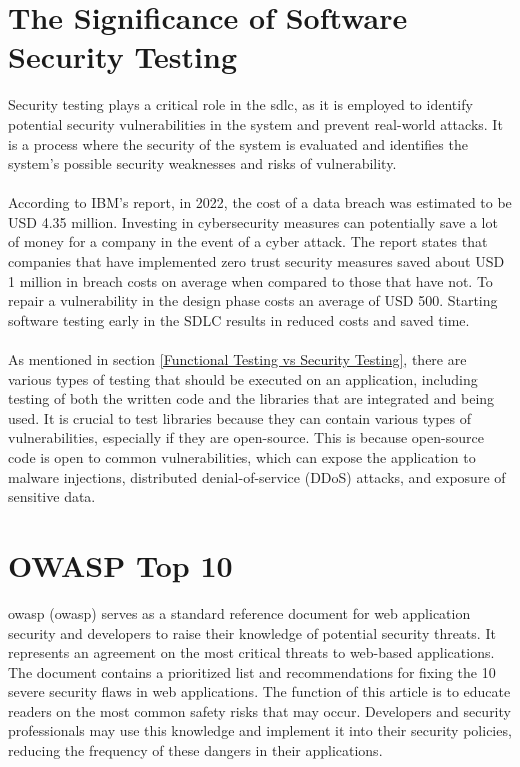 \section{The Significance of Software Security Testing}
Security testing plays a critical role in the \acrlong{sdlc}, as it is employed to identify potential security vulnerabilities in the system and prevent real-world attacks. It is a process where the security of the system is evaluated and identifies the system's possible security weaknesses and risks of vulnerability.\cite{whysectest}
\\~\\
According to IBM's report, in 2022, the cost of a data breach was estimated to be USD 4.35 million\cite{databreach}. Investing in cybersecurity measures can potentially save a lot of money for a company in the event of a cyber attack. The report states that companies that have implemented zero trust security measures saved about USD 1 million in breach costs on average when compared to those that have not. To repair a vulnerability in the design phase costs an average of USD 500\cite{fixvulnerability}. Starting software testing early in the SDLC results in reduced costs and saved time. 
\\~\\
As mentioned in section \ref{Functional Testing vs Security Testing}, there are various types of testing that should be executed on an application, including testing of both the written code and the libraries that are integrated and being used. It is crucial to test libraries because they can contain various types of vulnerabilities, especially if they are open-source. This is because open-source code is open to common vulnerabilities, which can expose the application to malware injections, distributed denial-of-service (DDoS) attacks, and exposure of sensitive data. \cite{testlibaries}

\section{OWASP Top 10}
\acrlong{owasp} (\acrshort{owasp}) serves as a standard reference document for web application security and developers to raise their knowledge of potential security threats. It represents an agreement on the most critical threats to web-based applications. The document contains a prioritized list and recommendations for fixing the 10 severe security flaws in web applications. The function of this article is to educate readers on the most common safety risks that may occur. Developers and security professionals may use this knowledge and implement it into their security policies, reducing the frequency of these dangers in their applications. 


